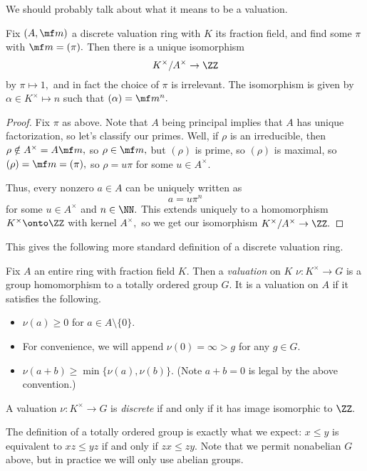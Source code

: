 We should probably talk about what it means to be a valuation.
\begin{proposition} \label{prop:forwards}
    Fix $(A,\mf m)$ a discrete valuation ring with $K$ its fraction field, and find some $\pi$ with $\mf m=(\pi).$ Then there is a unique isomorphism
    \[K^\times/A^\times\to\ZZ\]
    by $\pi\mapsto1,$ and in fact the choice of $\pi$ is irrelevant. The isomorphism is given by $\alpha\in K^\times\longmapsto n$ such that $(\alpha)=\mf m^{n}.$
\end{proposition}
\begin{proof}
    Fix $\pi$ as above. Note that $A$ being principal implies that $A$ has unique factorization, so let's classify our primes. Well, if $\rho$ is an irreducible, then $\rho\notin A^\times=A\mf m,$ so $\rho\in\mf m,$ but $(\rho)$ is prime, so $(\rho)$ is maximal, so $(\rho)=\mf m=(\pi),$ so $\rho=u\pi$ for some $u\in A^\times.$

    Thus, every nonzero $a\in A$ can be uniquely written as
    \[a=u\pi^n\]
    for some $u\in A^\times$ and $n\in\NN.$ This extends uniquely to a homomorphism $K^\times\onto\ZZ$ with kernel $A^\times,$ so we get our isomorphism $K^\times/A^\times\to\ZZ.$
\end{proof}
This gives the following more standard definition of a discrete valuation ring.
\begin{definition}[Valuation]
    Fix $A$ an entire ring with fraction field $K.$ Then a \textit{valuation} on $K$ $\nu:K^\times\to G$ is a group homomorphism to a totally ordered group $G.$ It is a valuation on $A$ if it satisfies the following.
    \begin{itemize}
        \item $\nu(a)\ge0$ for $a\in A\setminus\{0\}.$
        \item For convenience, we will append $\nu(0)=\infty>g$ for any $g\in G.$
        \item $\nu(a+b)\ge\min\{\nu(a),\nu(b)\}.$ (Note $a+b=0$ is legal by the above convention.)
    \end{itemize}
    A valuation $\nu:K^\times\to G$ is \textit{discrete} if and only if it has image isomorphic to $\ZZ.$
\end{definition}
The definition of a totally ordered group is exactly what we expect: $x\le y$ is equivalent to $xz\le yz$ if and only if $zx\le zy.$ Note that we permit nonabelian $G$ above, but in practice we will only use abelian groups.

